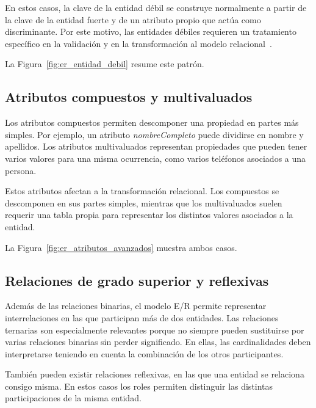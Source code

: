 En estos casos, la clave de la entidad débil se construye normalmente a partir de la clave de la entidad fuerte y de un atributo propio que actúa como discriminante. Por este motivo, las entidades débiles requieren un tratamiento específico en la validación y en la transformación al modelo relacional~\cite{tema6}.

La Figura~\ref{fig:er_entidad_debil} resume este patrón.


\subsection{Atributos compuestos y multivaluados}

Los atributos compuestos permiten descomponer una propiedad en partes más simples. Por ejemplo, un atributo \textit{nombreCompleto} puede dividirse en nombre y apellidos. Los atributos multivaluados representan propiedades que pueden tener varios valores para una misma ocurrencia, como varios teléfonos asociados a una persona.

Estos atributos afectan a la transformación relacional. Los compuestos se descomponen en sus partes simples, mientras que los multivaluados suelen requerir una tabla propia para representar los distintos valores asociados a la entidad.

La Figura~\ref{fig:er_atributos_avanzados} muestra ambos casos.


\subsection{Relaciones de grado superior y reflexivas}

Además de las relaciones binarias, el modelo E/R permite representar interrelaciones en las que participan más de dos entidades. Las relaciones ternarias son especialmente relevantes porque no siempre pueden sustituirse por varias relaciones binarias sin perder significado. En ellas, las cardinalidades deben interpretarse teniendo en cuenta la combinación de los otros participantes.

También pueden existir relaciones reflexivas, en las que una entidad se relaciona consigo misma. En estos casos los roles permiten distinguir las distintas participaciones de la misma entidad.

